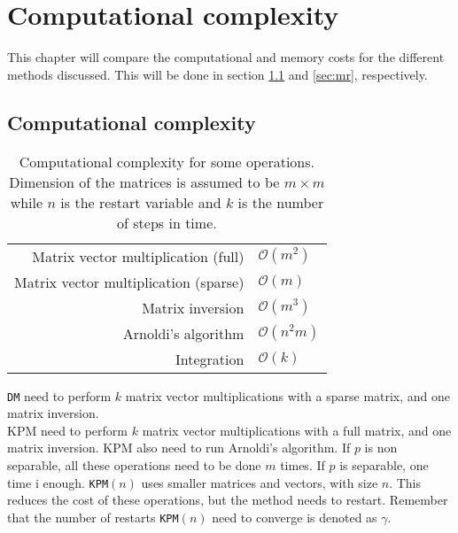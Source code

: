 \chapter{Computational complexity}%
\label{sec:comp}
This chapter will compare the computational and memory costs for the different methods discussed. This will be done in section \ref{sec:cc} and \ref{sec:mr}, respectively.
\section{Computational complexity} \label{sec:cc}
\begin{table}[H]
\centering
\begin{tabular}{r | l}
 Matrix vector multiplication (full) & $\mathcal{O}(m^2)$ \cite{complex} \\
 Matrix vector multiplication (sparse) & $\mathcal{O}(m)$ \cite{complex} \\
 Matrix inversion  & $ \mathcal{O}(m^3)$ \cite{complex} \\
 Arnoldi's algorithm & $ \mathcal{O}(n^2 m)$ \cite{krycomplex} \\
 Integration & $\mathcal{O}(k)$
\end{tabular}
\caption{Computational complexity for some operations. Dimension of the matrices is assumed to be $m \times m$ while $n$ is the restart variable and $k$ is the number of steps in time.}
\label{tab:runtime}
\end{table}
\texttt{DM} need to perform $k$ matrix vector multiplications with a sparse matrix, and one matrix inversion. \\

KPM need to perform $k$ matrix vector multiplications with a full matrix, and one matrix inversion. KPM also need to run Arnoldi's algorithm. If $p$ is non separable, all these operations need to be done $m$ times. If $p$ is separable, one time i enough. \texttt{KPM}$(n)$ uses smaller matrices and vectors, with size $n$. This reduces the cost of these operations, but the method needs to restart. Remember that the number of restarts \texttt{KPM}$(n)$ need to converge is denoted as  $\gamma$.\\ %

